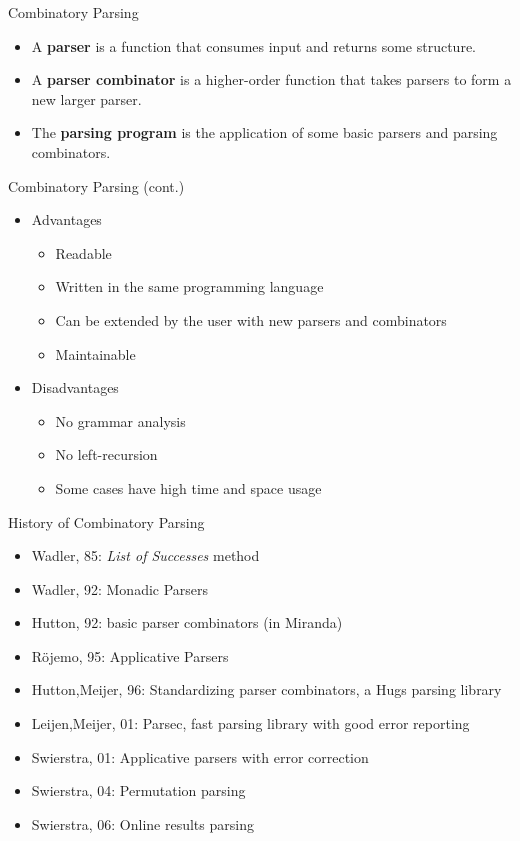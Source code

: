 \documentclass{beamer}
\begin{document}
\begin{frame}{Combinatory Parsing}
  \begin{itemize}
  \item A \textbf{parser} is a function that consumes input and returns some structure.
  \item A \textbf{parser combinator} is a higher-order function that takes parsers to form a new larger parser.
  \item The \textbf{parsing program} is the application of some basic parsers and parsing combinators.
  \end{itemize}
\end{frame}

\begin{frame}{Combinatory Parsing (cont.)}
  \begin{itemize}
  \item Advantages
    \begin{itemize}
    \item Readable
    \item Written in the same programming language
    \item Can be extended by the user with new parsers and combinators
    \item Maintainable
    \end{itemize}
  \item Disadvantages
    \begin{itemize}
    \item No grammar analysis
    \item No left-recursion 
    \item Some cases have high time and space usage
    \end{itemize}
  \end{itemize}
\end{frame}

\begin{frame}{History of Combinatory Parsing}
  \begin{itemize}
  \item Wadler, 85: \emph{List of Successes} method
  \item Wadler, 92: Monadic Parsers
  \item Hutton, 92: basic parser combinators (in Miranda)
  \item R\"ojemo, 95: Applicative Parsers
  \item Hutton,Meijer, 96: Standardizing parser combinators, a Hugs parsing library
  \item Leijen,Meijer, 01: Parsec, fast parsing library with good error reporting
  \item Swierstra, 01: Applicative parsers with error correction
  \item Swierstra, 04: Permutation parsing
  \item Swierstra, 06: Online results parsing
  \end{itemize}
\end{frame}
\end{document}
